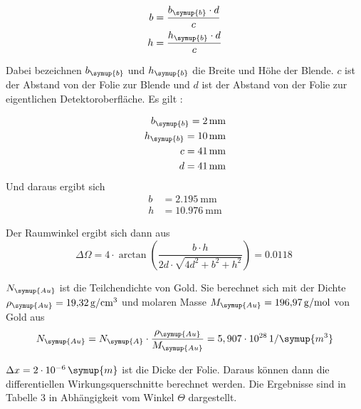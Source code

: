 \begin{align*}
  b &= \frac{b_\symup{b} \cdot d}{c} \\
  h &= \frac{h_\symup{b} \cdot d}{c}
\end{align*}

Dabei bezeichnen $b_\symup{b}$ und $h_\symup{b}$ die Breite und Höhe der Blende.
$c$ ist der Abstand von der Folie zur Blende und $d$ ist der Abstand von der Folie
zur eigentlichen Detektoroberfläche. Es gilt \cite{sample1}:

\begin{align*}
  b_\symup{b} = \SI{2}{\milli\meter} \\
  h_\symup{b} = \SI{10}{\milli\meter} \\
  c = \SI{41}{\milli\meter} \\
  d = \SI{41}{\milli\meter}
\end{align*}
Und daraus ergibt sich
\begin{align*}
  b &= \SI{2.195}{\milli\meter} \\
  h &= \SI{10.976}{\milli\meter}
\end{align*}

Der Raumwinkel ergibt sich dann aus \cite{sample2}
\begin{equation}
  \Delta \Omega = 4 \cdot \arctan\left(\frac{b \cdot h}{2d \cdot \sqrt{4d^2 + b^2 + h^2}}\right) = \SI{0.0118}{}
\end{equation}

$N_\symup{Au}$ ist die Teilchendichte von Gold. Sie berechnet sich mit der Dichte
$\rho_\symup{Au} = \SI{19.32}{\gram\per\centi\meter^3}$ \cite{sample} und molaren Masse $M_\symup{Au} = \SI{196.97}{\gram\per\mol}$ \cite{sample}
von Gold aus
\begin{equation}
  N_\symup{Au} = N_\symup{A} \cdot \frac{\rho_\symup{Au}}{M_\symup{Au}} = 5,907 \cdot 10^{28} \, 1/\symup{m^3}
  \label{eqn:teilchendichte}
\end{equation}


$\Delta x = 2 \cdot 10^{-6} \, \symup{m}$ ist die Dicke der Folie. Daraus können dann die
differentiellen Wirkungsquerschnitte berechnet werden. Die Ergebnisse sind in Tabelle 3
in Abhängigkeit vom Winkel $\Theta$ dargestellt.


